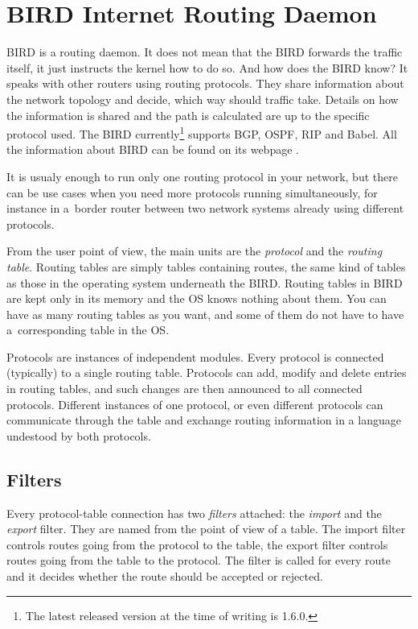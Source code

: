 \chapter{BIRD Internet Routing Daemon}

BIRD is a routing daemon. It does not mean that the BIRD forwards the traffic
itself, it just instructs the kernel how to do so. And how does the BIRD know?
It speaks with other routers using routing protocols. They share information
about the network topology and decide, which way should traffic take. Details
on how the information is shared and the path is calculated are up to the
specific protocol used. The BIRD currently\footnote{The latest released version
at the time of writing is 1.6.0.} supports BGP, OSPF, RIP and Babel. All the information about BIRD can be found on its webpage \cite{birdweb}.

It is usualy enough to run only one routing protocol in your network, but there
can be use cases when you need more protocols running simultaneously, for instance in a~border
router between two network systems already using different protocols.

From the user point of view, the main units are the \emph{protocol} and the
\emph{routing table}. Routing tables are simply tables containing routes, the
same kind of tables as those in the operating system underneath the BIRD.
Routing tables in BIRD are kept only in its memory and the OS knows nothing
about them. You can have as many routing tables as you want, and some of them do
not have to have a~corresponding table in the OS.

Protocols are instances of independent modules. Every protocol is connected
(typically) to a single routing table. Protocols can add, modify and delete entries
in routing tables, and such changes are then announced to all connected
protocols. Different instances of one protocol, or even different protocols can
communicate through the table and exchange routing information in a language
undestood by both protocols.

\section{Filters}
Every protocol-table connection has two \emph{filters} attached: the
\emph{import} and the \emph{export} filter. They are named from the point of
view of a table. The import filter controls routes going from the protocol to
the table, the export filter controls routes going from the table to the
protocol. The filter is called for every route and it decides whether the route
should be accepted or rejected.

